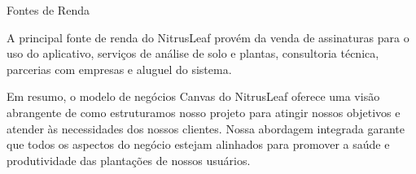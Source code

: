     Fontes de Renda
    
    A principal fonte de renda do NitrusLeaf provém da venda de assinaturas para o uso do aplicativo, serviços de análise de solo e plantas, consultoria técnica, parcerias com empresas e aluguel do sistema.
    
    Em resumo, o modelo de negócios Canvas do NitrusLeaf oferece uma visão abrangente de como estruturamos nosso projeto para atingir nossos objetivos e atender às necessidades dos nossos clientes. Nossa abordagem integrada garante que todos os aspectos do negócio estejam alinhados para promover a saúde e produtividade das plantações de nossos usuários.